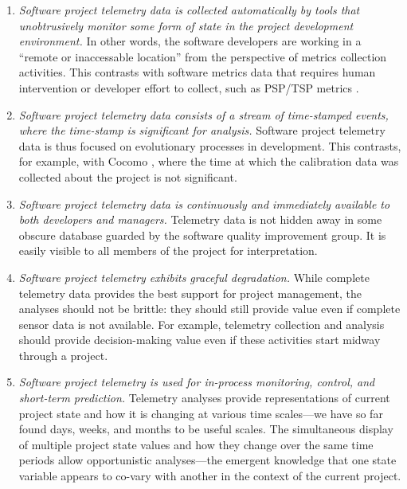 \documentclass[11pt,twocolumn]{article}
\begin{document}
\begin{enumerate}

\item {\em Software project telemetry data is collected automatically by tools
   that unobtrusively monitor some form of state in the project
   development environment.}  In other words, the software developers are
   working in a ``remote or inaccessable location'' from the perspective of
   metrics collection activities. This contrasts with software metrics data
   that requires human intervention or developer effort to collect, such as
   PSP/TSP metrics \cite{Humphrey95}.
        
\item {\em Software project telemetry data consists of a stream of
   time-stamped events, where the time-stamp is significant for analysis.}
   Software project telemetry data is thus focused on evolutionary
   processes in development.  This contrasts, for example, with Cocomo
   \cite{Boehm81}, where the time at which the calibration data was
   collected about the project is not significant.

\item {\em Software project telemetry data is continuously and immediately 
available to both developers and managers.}  Telemetry data is not hidden
away in some obscure database guarded by the software quality improvement
group.  It is easily visible to all members of the project for 
interpretation. 

\item {\em Software project telemetry exhibits graceful degradation.}
While complete telemetry data provides the best support for project
management, the analyses should not be brittle: they should still provide
value even if complete sensor data is not available. For example, 
telemetry collection and analysis should provide decision-making
value even if these activities start midway through a project.
         
\item {\em Software project telemetry is used for in-process monitoring,
   control, and short-term prediction.} Telemetry analyses provide
   representations of current project state and how it is changing at
   various time scales---we have so far found days, weeks, and months to be
   useful scales.  The simultaneous display of multiple project state values and
   how they change over the same time periods allow opportunistic
   analyses---the emergent knowledge that one state variable appears to
   co-vary with another in the context of the current project.


\end{enumerate}
\end{document}
